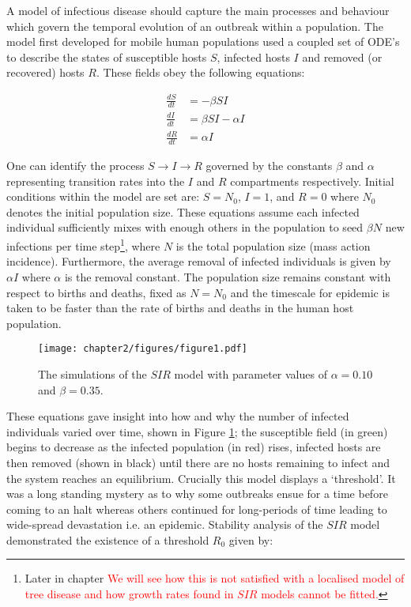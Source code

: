 A model of infectious disease should capture the main processes and behaviour which govern the temporal evolution of an outbreak within a population. The model first developed for mobile human populations \citep{kermack-model} used a coupled set of ODE's to describe the states of susceptible hosts $S$, infected hosts $I$ and removed (or recovered) hosts $R$. These fields obey the following equations:

\begin{align}
\label{eq:sir1}
\frac{dS}{dt}&=  -\beta S I \\
\frac{dI}{dt} &=  \beta S I - \alpha I \\
\frac{dR}{dt} &= \alpha I 
\label{eq:sir3}
\end{align}

One can identify the process $S\rightarrow I \rightarrow R$ governed by the constants $\beta$ and $\alpha$ representing transition rates into the $I$ and $R$ compartments respectively. Initial conditions within the model are set are: $S=N_0$, $I=1$, and $R=0$ where $N_0$ denotes the initial population size. These equations assume each infected individual sufficiently mixes with enough others in the population to seed $\beta N$ new infections per time step\footnote{Later in chapter \textcolor{red}{We will see how this is not satisfied with a localised model of tree disease and how growth rates found in $SIR$ models cannot be fitted.}}, where $N$ is the total population size (mass action incidence). Furthermore, the average removal of infected individuals is given by $\alpha I$ where $\alpha$ is the removal constant. The population size remains constant with respect to births and deaths, fixed as $N=N_0$ and the timescale for epidemic is taken to be faster than the rate of births and deaths in the human host population. 

\begin{figure}
    \centering
    \texttt{[image: chapter2/figures/figure1.pdf]}
    \caption{The simulations of the $SIR$ model with parameter values of $\alpha = 0.10$ and $\beta = 0.35$.}
    \label{fig:sir}
\end{figure}

These equations gave insight into how and why the number of infected individuals varied over time, shown in Figure \ref{fig:sir}; the susceptible field (in green) begins to decrease as the  infected population (in red) rises, infected hosts are then removed (shown in black) until there are no hosts remaining to infect and the system reaches an equilibrium. Crucially this model displays a `threshold'. It was a long standing mystery as to why some outbreaks ensue for a time before coming to an halt whereas others continued for long-periods of time leading to wide-spread devastation i.e. an epidemic. Stability analysis of the $SIR$ model demonstrated the existence of a threshold $R_0$ given by:

